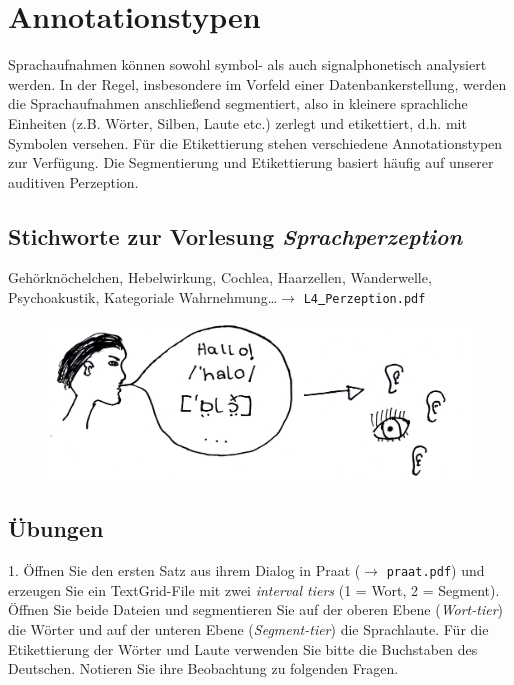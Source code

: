 \documentclass[11pt]{book}
\begin{document}
\chapter{Annotationstypen}

Sprachaufnahmen können sowohl symbol- als auch signalphonetisch analysiert werden. In der Regel, insbesondere im Vorfeld einer Datenbankerstellung, werden die Sprachaufnahmen anschließend segmentiert, also in kleinere sprachliche Einheiten (z.\thinspace B. Wörter, Silben, Laute etc.) zerlegt und etikettiert, d.\thinspace h. mit Symbolen versehen. Für die Etikettierung stehen verschiedene Annotationstypen zur Verfügung. Die Segmentierung und Etikettierung basiert häufig auf unserer auditiven Perzeption.

\section{Stichworte zur Vorlesung \em{Sprachperzeption}}

Gehörknöchelchen, Hebelwirkung, Cochlea, Haarzellen, Wanderwelle, Psychoakustik, Kategoriale Wahrnehmung\dots $\rightarrow$ {\tt L4\underline{\ }Perzeption.pdf}

\begin{figure}[htbp]
\begin{center}
\includegraphics[width=\textwidth]{grafiken/annotationstypen/annotationstypen}
\label{t3}
\end{center}
\end{figure}
\section{Übungen}
 
1.	Öffnen Sie den ersten Satz aus ihrem Dialog in Praat ($\rightarrow$ {\tt praat.pdf}) und erzeugen Sie ein TextGrid-File mit zwei \emph{interval tiers} (1 = Wort, 2 = Segment). Öffnen Sie beide Dateien und segmentieren Sie auf der oberen Ebene (\emph{Wort-tier}) die Wörter und auf der unteren Ebene (\emph{Segment-tier}) die Sprachlaute. Für die Etikettierung der Wörter und Laute verwenden Sie bitte die Buchstaben des Deutschen. Notieren Sie ihre Beobachtung zu folgenden Fragen.\\
\newline
\end{document}
